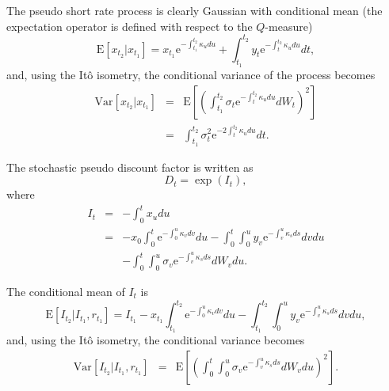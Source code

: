 \documentclass{report}
\newcommand{\E}{\mathrm{E}}
\newcommand{\Var}{\mathrm{Var}}
\newcommand{\e}{\text{e}}
\begin{document}
The pseudo short rate process is clearly Gaussian with conditional mean (the expectation operator is defined with respect to the $Q$-measure)
\begin{equation}
\E \left[ x_{t_2} | x_{t_1} \right] = x_{t_1} \e^{-\int_{t_1}^{t_2} \kappa_u du}  + \int_{t_1}^{t_2} y_t \e^{-\int_t^{t_2} \kappa_u du} dt,
\end{equation}
and, using the It\^{o} isometry, the conditional variance of the process becomes
\begin{eqnarray}
\Var \left[ x_{t_2} | x_{t_1} \right] &=& \E \left[ \left( \int_{t_1}^{t_2} \sigma_t \e^{-\int_t^{t_2} \kappa_u du} dW_t \right)^2 \right] \\
&=& \int_{t_1}^{t_2} \sigma_t^2 \e^{-2\int_t^{t_2} \kappa_u du} dt.
\end{eqnarray}

The stochastic pseudo discount factor is written as
\begin{equation}
D_{t} = \exp \left( I_t \right),
\end{equation}
where
\begin{eqnarray}
I_t &=& -\int_0^t x_u du \\
&=& - x_{0} \int_0^t \e^{-\int_{0}^{u} \kappa_v dv} du - \int_0^t\int_{0}^{u} y_v \e^{-\int_v^{u} \kappa_s ds} dv du \\
&& - \int_0^t \int_{0}^{u} \sigma_v \e^{-\int_v^{u} \kappa_s ds} dW_v du.
\end{eqnarray}

The conditional mean of $I_t$ is
\begin{equation}
\E \left[ I_{t_{2}} | I_{t_1}, r_{t_1} \right] = I_{t_1} - x_{t_1} \int_{t_1}^{t_2} \e^{-\int_{0}^{u} \kappa_v dv} du - \int_{t_1}^{t_2} \int_{0}^{u} y_v \e^{-\int_v^{u} \kappa_s ds} dv du,
\end{equation}
and, using the It\^{o} isometry, the conditional variance becomes
\begin{eqnarray}
\Var \left[ I_{t_{2}} | I_{t_1}, r_{t_1} \right] &=& \E \left[ \left( \int_0^t \int_{0}^{u} \sigma_v \e^{-\int_v^{u} \kappa_s ds} dW_v du \right)^2 \right].
\end{eqnarray}


 
\end{document}
